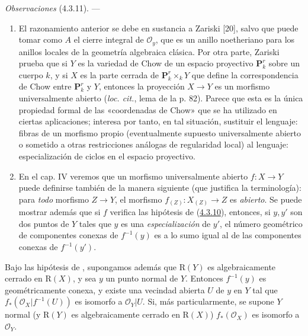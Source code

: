 \begin{env}[4.3.11]
\label{III.4.3.11-fr}
\emph{Observaciones} (4.3.11). ---
\begin{enumerate}
\item[(i)] El razonamiento anterior se debe en sustancia a Zariski [20],
salvo que puede tomar como $A$ el cierre integral de
$\mathcal O_y$, que es un anillo noetheriano para los anillos locales
de la geometría algebraica clásica. Por otra parte, Zariski prueba que si
$Y$ es la variedad de Chow de un espacio proyectivo $\mathbf P_k^r$ sobre un
cuerpo $k$, y si $X$ es la parte cerrada de $\mathbf P_k^r\times_kY$ que
define la correspondencia de Chow entre $\mathbf P_k^r$ y $Y$, entonces la
proyección $X\to Y$ es un morfismo universalmente abierto
(\emph{loc. cit.}, lema de la p. 82). Parece que esta es la única
propiedad formal de las «coordenadas de Chow» que se ha utilizado en
ciertas aplicaciones; interesa por tanto, en tal situación,
sustituir el lenguaje: fibras de un morfismo propio (eventualmente
supuesto universalmente abierto o sometido a otras restricciones análogas
de regularidad local) al lenguaje: especialización de ciclos en el espacio
proyectivo.

\item[(ii)] En el cap. IV veremos que un morfismo universalmente abierto
$f:X\to Y$ puede definirse también de la manera siguiente (que justifica la
terminología): para \emph{todo} morfismo $Z\to Y$, el morfismo
$f_{(Z)}:X_{(Z)}\to Z$ es \emph{abierto}. Se puede mostrar además que si $f$
verifica las hipótesis de (\hyperref[III.4.3.10-fr]{4.3.10}), entonces, si
$y,y'$ son dos puntos de $Y$ tales que $y$ es una \emph{especialización} de $y'$,
el número geométrico de componentes conexas de $f^{-1}(y)$ es a lo sumo
igual al de las componentes conexas de $f^{-1}(y')$.
\end{enumerate}
\end{env}

\begin{corollary}[4.3.12]
\label{III.4.3.12}
\label{III.4.3.12-fr}
Bajo las hipótesis de , supongamos además que
$\mathrm R(Y)$ es algebraicamente cerrado en $\mathrm R(X)$, y sea
$y$ un punto normal de $Y$. Entonces $f^{-1}(y)$ es geométricamente
conexa, y existe una vecindad abierta $U$ de $y$ en $Y$ tal que
$f_*(\mathcal O_X|f^{-1}(U))$ es isomorfo a $\mathcal O_Y|U$. Si, más
particularmente, se supone $Y$ normal (y $\mathrm R(Y)$ es algebraicamente
cerrado en $\mathrm R(X)$) $f_*(\mathcal O_X)$ es isomorfo a
$\mathcal O_Y$.
\end{corollary}

